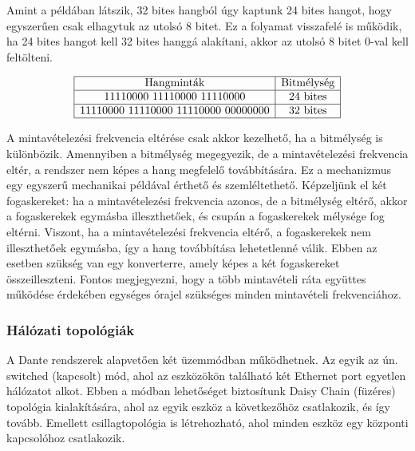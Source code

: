 Amint a példában látszik, 32 bites hangból úgy kaptunk 24 bites hangot, 
hogy egyszerűen csak elhagytuk az utolsó 8 bitet. Ez a folyamat visszafelé is működik,
ha 24 bites hangot kell 32 bites hanggá alakítani, akkor az utolsó 8 bitet 0-val kell feltölteni.

\begin{align*}
	\begin{array}{|c|c|}
	\hline
	\text{Hangminták} & \text{Bitmélység} \\
	\hline
	\text{11110000 11110000 11110000} & \text{24 bites} \\
	\hline
	\text{11110000 11110000 11110000 00000000} & \text{32 bites} \\
	\hline
	\end{array}
\end{align*}

A mintavételezési frekvencia eltérése csak akkor kezelhető, ha a bitmélység is különbözik. 
Amennyiben a bitmélység megegyezik, de a mintavételezési frekvencia eltér, a rendszer nem 
képes a hang megfelelő továbbítására. Ez a mechanizmus egy egyszerű mechanikai példával 
érthető és szemléltethető. Képzeljünk el két fogaskereket: ha a mintavételezési frekvencia 
azonos, de a bitmélység eltérő, akkor a fogaskerekek egymásba illeszthetőek, és csupán a 
fogaskerekek mélysége fog eltérni. Viszont, ha a mintavételezési frekvencia eltérő, a 
fogaskerekek nem illeszthetőek egymásba, így a hang továbbítása lehetetlenné válik. 
Ebben az esetben szükség van egy konverterre, amely képes a két fogaskereket összeilleszteni. 
Fontos megjegyezni, hogy a több mintavételi ráta együttes működése érdekében egységes 
órajel szükséges minden mintavételi frekvenciához.

\subsubsection{Hálózati topológiák}
A Dante rendszerek alapvetően két üzemmódban működhetnek. Az egyik az ún. 
switched (kapcsolt) mód, ahol az eszközökön található két Ethernet port egyetlen 
hálózatot alkot. Ebben a módban lehetőséget biztosítunk Daisy Chain (füzéres) 
topológia kialakítására, ahol az egyik eszköz a következőhöz csatlakozik, és így tovább. 
Emellett csillagtopológia is létrehozható, ahol minden eszköz egy központi kapcsolóhoz 
csatlakozik.

